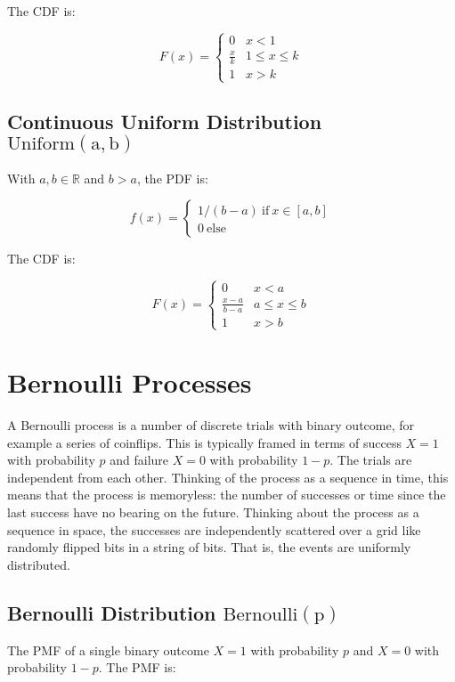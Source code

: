 The CDF is:

\begin{equation}
F(x)= \left\{\begin{array}{cl} 
0& x < 1\\
\frac{x}{k}& 1\leq x \leq k\\
1& x>k
\end{array} \right.
\end{equation}

\subsection{Continuous Uniform Distribution $\mathrm{Uniform(a,b)}$}

With $a,b\in\mathbb{R}$ and $b>a$, the PDF is:

\begin{equation}
f(x) = \left\{\begin{array}{l} 1/(b-a) \mathrm{\ if\ }x \in [a,b] \\ 0\mathrm{\ else}\end{array} \right.
\end{equation}

The CDF is:

\begin{equation}
F(x)= \left\{\begin{array}{cl} 
0& x < a\\
\frac{x-a}{b-a}& a\leq x \leq b\\
1& x>b
\end{array} \right.
\end{equation}


\section{Bernoulli Processes}
A Bernoulli process is a number of discrete trials with binary outcome, for example a series of coinflips. This is typically framed in terms of success $X=1$ with probability $p$ and failure $X=0$ with probability $1-p$. The trials are independent from each other. Thinking of the process as a sequence in time, this means that the process is memoryless: the number of successes or time since the last success have no bearing on the future. Thinking about the process as a sequence in space, the successes are independently scattered over a grid like randomly flipped bits in a string of bits. That is, the events are uniformly distributed.


\subsection{Bernoulli Distribution $\mathrm{Bernoulli(p)}$}
The PMF of a single binary outcome $X=1$ with probability $p$ and $X=0$ with probability $1-p$. The PMF is:

